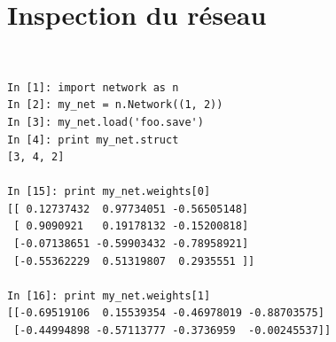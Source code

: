 \documentclass[11pt]{article}
\begin{document}
\section{Inspection du r\'eseau}
\label{inspect}
 \\
\begin{lstlisting}
In [1]: import network as n
In [2]: my_net = n.Network((1, 2))
In [3]: my_net.load('foo.save')                
In [4]: print my_net.struct 
[3, 4, 2]                    

In [15]: print my_net.weights[0]                                                           
[[ 0.12737432  0.97734051 -0.56505148]                                                     
 [ 0.9090921   0.19178132 -0.15200818]                                                     
 [-0.07138651 -0.59903432 -0.78958921]                                                     
 [-0.55362229  0.51319807  0.2935551 ]]                                                    
                                                                                           
In [16]: print my_net.weights[1]                                                           
[[-0.69519106  0.15539354 -0.46978019 -0.88703575]                                         
 [-0.44994898 -0.57113777 -0.3736959  -0.00245537]]                                        
                                                                                           

\end{lstlisting}
\end{document}
